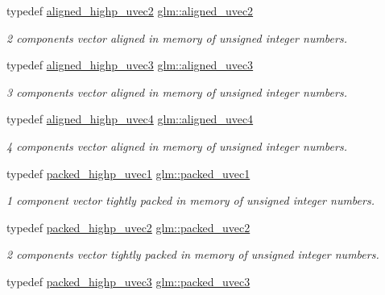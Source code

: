 \begin{DoxyCompactItemize}
typedef \hyperlink{group__gtc__type__aligned_ga4497b2f3be81910c7a1bf632b51ac9a6}{aligned\+\_\+highp\+\_\+uvec2} \hyperlink{group__gtc__type__aligned_gacddd39189c2dedf7dd48c02155279124}{glm\+::aligned\+\_\+uvec2}
\begin{DoxyCompactList}\small\item\em 2 components vector aligned in memory of unsigned integer numbers. \end{DoxyCompactList}\item 
typedef \hyperlink{group__gtc__type__aligned_ga1d303644825af6267389d6405f490ddc}{aligned\+\_\+highp\+\_\+uvec3} \hyperlink{group__gtc__type__aligned_ga5dee635ca69be0f5de5630a59d89034f}{glm\+::aligned\+\_\+uvec3}
\begin{DoxyCompactList}\small\item\em 3 components vector aligned in memory of unsigned integer numbers. \end{DoxyCompactList}\item 
typedef \hyperlink{group__gtc__type__aligned_ga85553b476297f73c07bf3228ffb02d81}{aligned\+\_\+highp\+\_\+uvec4} \hyperlink{group__gtc__type__aligned_ga1e0792f3c64836e042ee3aad9bd8209c}{glm\+::aligned\+\_\+uvec4}
\begin{DoxyCompactList}\small\item\em 4 components vector aligned in memory of unsigned integer numbers. \end{DoxyCompactList}\item 
typedef \hyperlink{group__gtc__type__aligned_ga160352f526bef94d143ccb525095936e}{packed\+\_\+highp\+\_\+uvec1} \hyperlink{group__gtc__type__aligned_gab4eb372e84e817a0d29128128394df01}{glm\+::packed\+\_\+uvec1}
\begin{DoxyCompactList}\small\item\em 1 component vector tightly packed in memory of unsigned integer numbers. \end{DoxyCompactList}\item 
typedef \hyperlink{group__gtc__type__aligned_gafd17d664314ead069de290b1d5137c47}{packed\+\_\+highp\+\_\+uvec2} \hyperlink{group__gtc__type__aligned_gac05992fb0ced52150634ce1d8f95a8ad}{glm\+::packed\+\_\+uvec2}
\begin{DoxyCompactList}\small\item\em 2 components vector tightly packed in memory of unsigned integer numbers. \end{DoxyCompactList}\item 
typedef \hyperlink{group__gtc__type__aligned_ga607425d3ca2ad292b115d09aef19e372}{packed\+\_\+highp\+\_\+uvec3} \hyperlink{group__gtc__type__aligned_ga4433b8f226dc66e91e99cb8079ddc7e3}{glm\+::packed\+\_\+uvec3}

\end{DoxyCompactItemize}
